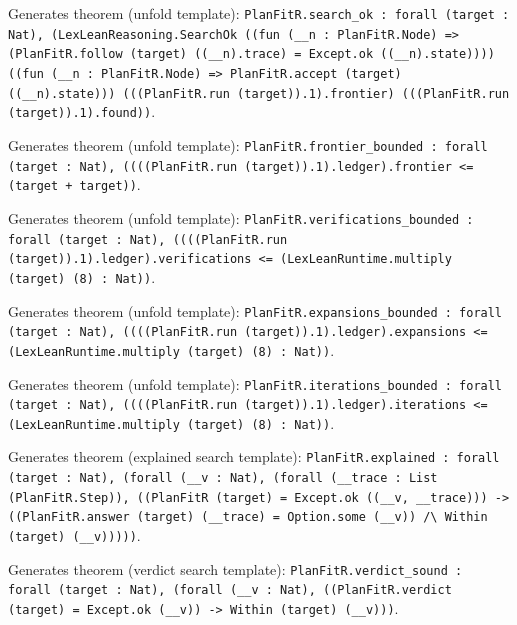 \documentclass[11pt]{article}
\begin{document}
\noindent Generates theorem (unfold template): \texttt{PlanFitR.search\_ok : forall (target : Nat), (LexLeanReasoning.SearchOk ((fun (\_\_n : PlanFitR.Node) => (PlanFitR.follow (target) ((\_\_n).trace) = Except.ok ((\_\_n).state)))) ((fun (\_\_n : PlanFitR.Node) => PlanFitR.accept (target) ((\_\_n).state))) (((PlanFitR.run (target)).1).frontier) (((PlanFitR.run (target)).1).found))}.\par
\noindent Generates theorem (unfold template): \texttt{PlanFitR.frontier\_bounded : forall (target : Nat), ((((PlanFitR.run (target)).1).ledger).frontier <= (target + target))}.\par
\noindent Generates theorem (unfold template): \texttt{PlanFitR.verifications\_bounded : forall (target : Nat), ((((PlanFitR.run (target)).1).ledger).verifications <= (LexLeanRuntime.multiply (target) (8) : Nat))}.\par
\noindent Generates theorem (unfold template): \texttt{PlanFitR.expansions\_bounded : forall (target : Nat), ((((PlanFitR.run (target)).1).ledger).expansions <= (LexLeanRuntime.multiply (target) (8) : Nat))}.\par
\noindent Generates theorem (unfold template): \texttt{PlanFitR.iterations\_bounded : forall (target : Nat), ((((PlanFitR.run (target)).1).ledger).iterations <= (LexLeanRuntime.multiply (target) (8) : Nat))}.\par
\noindent Generates theorem (explained search template): \texttt{PlanFitR.explained : forall (target : Nat), (forall (\_\_v : Nat), (forall (\_\_trace : List (PlanFitR.Step)), ((PlanFitR (target) = Except.ok ((\_\_v, \_\_trace))) -> ((PlanFitR.answer (target) (\_\_trace) = Option.some (\_\_v)) /\textbackslash{} Within (target) (\_\_v)))))}.\par
\noindent Generates theorem (verdict search template): \texttt{PlanFitR.verdict\_sound : forall (target : Nat), (forall (\_\_v : Nat), ((PlanFitR.verdict (target) = Except.ok (\_\_v)) -> Within (target) (\_\_v)))}.\par
\end{document}
